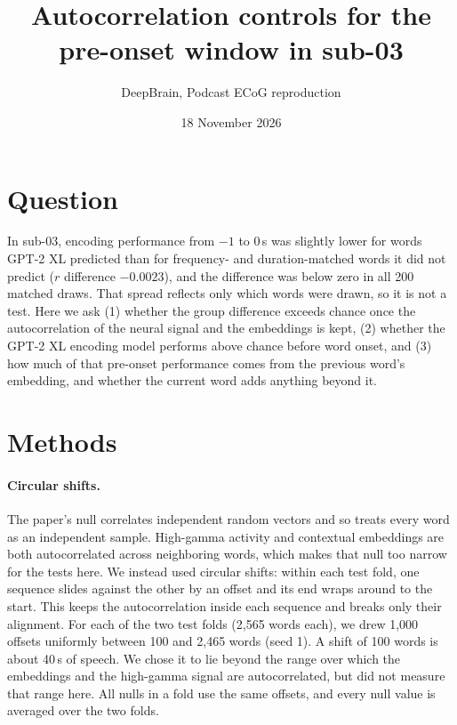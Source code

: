 \documentclass[11pt]{article}
\title{Autocorrelation controls for the pre-onset window in sub-03}
\author{DeepBrain, Podcast ECoG reproduction}
\date{18 November 2026}
\begin{document}
\maketitle

\section{Question}

In sub-03, encoding performance from $-1$ to 0\,s was slightly lower for words GPT-2 XL predicted than for frequency- and duration-matched words it did not predict ($r$ difference $-0.0023$), and the difference was below zero in all 200 matched draws. That spread reflects only which words were drawn, so it is not a test. Here we ask (1) whether the group difference exceeds chance once the autocorrelation of the neural signal and the embeddings is kept, (2) whether the GPT-2 XL encoding model performs above chance before word onset, and (3) how much of that pre-onset performance comes from the previous word's embedding, and whether the current word adds anything beyond it.

\section{Methods}

\paragraph{Circular shifts.}
The paper's null correlates independent random vectors and so treats every word as an independent sample. High-gamma activity and contextual embeddings are both autocorrelated across neighboring words, which makes that null too narrow for the tests here. We instead used circular shifts: within each test fold, one sequence slides against the other by an offset and its end wraps around to the start. This keeps the autocorrelation inside each sequence and breaks only their alignment. For each of the two test folds (2,565 words each), we drew 1,000 offsets uniformly between 100 and 2,465 words (seed 1). A shift of 100 words is about 40\,s of speech. We chose it to lie beyond the range over which the embeddings and the high-gamma signal are autocorrelated, but did not measure that range here. All nulls in a fold use the same offsets, and every null value is averaged over the two folds.
\end{document}
